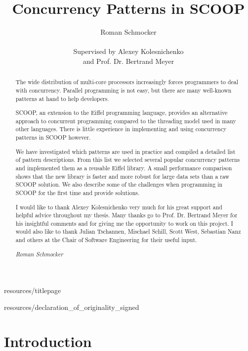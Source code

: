 \documentclass[a4paper,10pt,titlepage]{article}
\title{Concurrency Patterns in SCOOP}
\author{Roman Schmocker \\ \\ Supervised by Alexey Kolesnichenko \\ and Prof. Dr. Bertrand Meyer}
\begin{document}
 {resources/titlepage}

 {resources/declaration_of_originality_signed}

\begin{abstract}
\thispagestyle{plain}
\setcounter{page}{3}
The wide distribution of multi-core processors increasingly forces programmers to deal with concurrency.
Parallel programming is not easy, but there are many well-known patterns at hand to help developers.

SCOOP, an extension to the Eiffel programming language, provides an alternative approach to concurrent programming compared to the threading mo\-del used in many other languages.
There is little experience in implementing and using concurrency patterns in SCOOP however.

We have investigated which patterns are used in practice and compiled a detailed list of pattern descriptions.
From this list we selected several popular concurrency patterns and implemented them as a reusable Eiffel library.
A small performance comparison shows that the new library is faster and more robust for large data sets than a raw SCOOP solution.
We also describe some of the challenges when programming in SCOOP for the first time and provide solutions.
\end{abstract}

\renewcommand{\abstractname}{Acknowledgements}
\begin{abstract}
\thispagestyle{plain}
\setcounter{page}{4}
I would like to thank Alexey Kolesnichenko very much for his great support and helpful advice throughout my thesis.
Many thanks go to Prof. Dr. Bertrand Meyer for his insightful comments and for giving me the opportunity to work on this project.
I would also like to thank Julian Tschannen, Mischael Schill, Scott West, Sebastian Nanz and others at the Chair of Software Engineering for their useful input.

\emph{Roman Schmocker}
\end{abstract}


\setcounter{page}{5}
\tableofcontents

\newpage
\mbox{}

\newpage
{}

\section{Introduction}
\label{sec:introduction}
\end{document}
